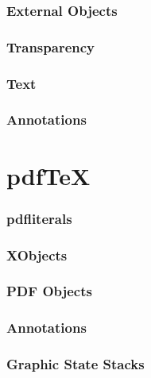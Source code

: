 

\section{External Objects}



\section{Transparency}



\section{Text}



\section{Annotations}



\part{pdf\TeX}



\section{pdfliterals}



\section{XObjects}



\section{PDF Objects}



\section{Annotations}



\section{Graphic State Stacks}



\bye

